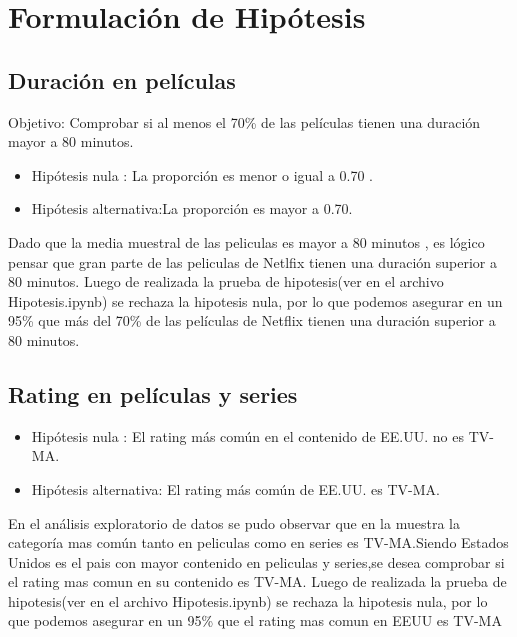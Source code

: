 \documentclass{article}
\begin{document}
\section{Formulación de Hipótesis}

\subsection{ Duración en películas}
 Objetivo: Comprobar si al menos el 70\% de las películas tienen una duración mayor a 80 minutos.

\begin{itemize}
	\item Hipótesis nula : La proporción es menor o igual a 0.70 .
	\item Hipótesis alternativa:La proporción es mayor a 0.70.
\end{itemize}

Dado que la media muestral de las peliculas es mayor a 80 minutos , es lógico pensar que gran parte de las peliculas de Netlfix tienen una duración superior a 80 minutos.
\newline
\newline
Luego de realizada la prueba de hipotesis(ver en el archivo Hipotesis.ipynb) se rechaza la hipotesis nula, por lo que podemos asegurar en un 95\%  que más del 70\% de las películas de Netflix tienen una duración superior a 80 minutos.


\subsection{Rating en películas y series}
\begin{itemize}
	\item Hipótesis nula :  El rating más común en el contenido  de EE.UU. no es TV-MA.
	\item Hipótesis alternativa: El rating más común de EE.UU. es TV-MA.
\end{itemize}
En el análisis exploratorio de datos se pudo observar que en la muestra  la categoría mas común tanto en peliculas como en series es TV-MA.Siendo Estados Unidos es el pais con mayor contenido en peliculas y series,se desea comprobar si el rating mas comun en su contenido es TV-MA.
\newline
\newline
Luego de realizada la prueba de hipotesis(ver en el archivo Hipotesis.ipynb) se rechaza la hipotesis nula, por lo que podemos asegurar en un 95\%  que  el rating mas comun en EEUU es TV-MA
\end{document}
